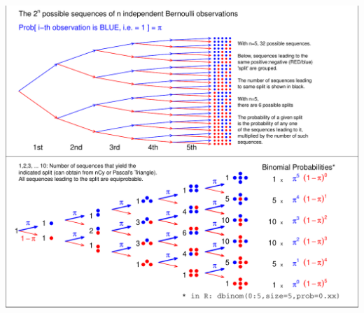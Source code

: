 \documentclass[handout]{beamer}\usepackage[]{graphicx}\usepackage[]{color}
\newenvironment{knitrout}{}{} %
\begin{document}

\begin{frame}[fragile]{}
\begin{knitrout}\scriptsize
{}\color{fgcolor}

{\centering \includegraphics[width=1\linewidth]{figure/unnamed-chunk-3-1} 

}



\end{knitrout}
\end{frame}
\end{document}
